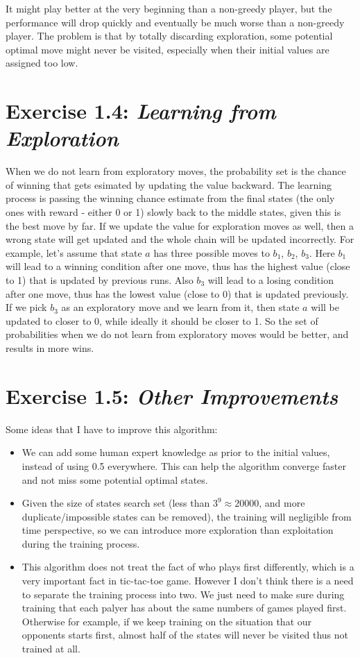 \documentclass[12pt,letterpaper]{article}
\begin{document}
It might play better at the very beginning than a non-greedy player, but the performance will drop quickly and eventually be much worse than a non-greedy player. The problem is that by totally discarding exploration, some potential optimal move might never be visited, especially when their initial values are assigned too low.

\section*{Exercise 1.4: \textit{Learning from Exploration} }
\label{1.4}

When we do not learn from exploratory moves, the probability set is the chance of winning that gets esimated by updating the value backward. The learning process is passing the winning chance estimate from the final states (the only ones with reward - either 0 or 1) slowly back to the middle states, given this is the best move by far. If we update the value for exploration moves as well, then a wrong state will get updated and the whole chain will be updated incorrectly. For example, let's assume that state $a$ has three possible moves to $b_1$, $b_2$, $b_3$. Here $b_1$ will lead to a winning condition after one move, thus has the highest value (close to 1) that is updated by previous runs. Also $b_3$ will lead to a losing condition after one move, thus has the lowest value (close to 0) that is updated previously. If we pick $b_3$ as an exploratory move and we learn from it, then state $a$ will be updated to closer to 0, while ideally it should be closer to 1. So the set of probabilities when we do not learn from exploratory moves would be better, and results in more wins.

\section*{Exercise 1.5: \textit{Other Improvements} }
\label{1.5}

Some ideas that I have to improve this algorithm:
\begin{itemize}
  \item We can add some human expert knowledge as prior to the initial values, instead of using 0.5 everywhere. This can help the algorithm converge faster and not miss some potential optimal states. 
  \item Given the size of states search set (less than $3^9 \approx 20000$, and more duplicate/impossible states can be removed), the training will negligible from time perspective, so we can introduce more exploration than exploitation during the training process.
  \item This algorithm does not treat the fact of who plays first differently, which is a very important fact in tic-tac-toe game. However I don't think there is a need to separate the training process into two. We just need to make sure during training that each palyer has about the same numbers of games played first. Otherwise for example, if we keep training on the situation that our opponents starts first, almost half of the states will never be visited thus not trained at all. 
\end{itemize}
\clearpage
\end{document}
